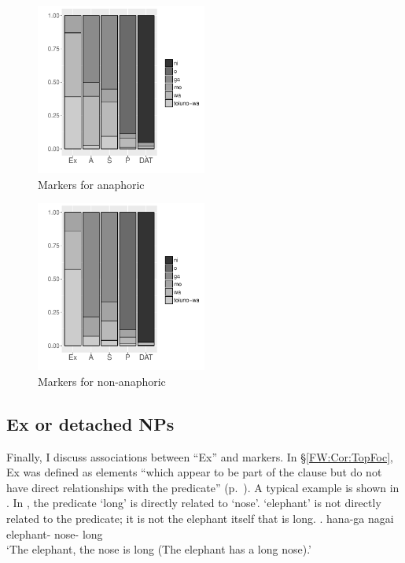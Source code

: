 \begin{figure}
	\begin{center}
	\includegraphics[width=0.5\textwidth]{figure/ASPParGiven.pdf}
	\caption{Markers for anaphoric}
	\label{Par:ASPParGivenF}
	\end{center}
\end{figure}
\begin{figure}
	\begin{center}
	\includegraphics[width=0.5\textwidth]{figure/ASPParNew.pdf}
	\caption{Markers for non-anaphoric}
	\label{Par:ASPParNewF}
	\end{center}
\end{figure}


\subsection{Ex or detached NPs}\label{Par:Subj:Ex}

Finally, I discuss associations between ``Ex'' and  markers.
In \S \ref{FW:Cor:TopFoc},
Ex was defined as elements ``which appear to be part of the clause but do not have direct relationships with the predicate'' (p.~\pageref{FW:Cor:TopFoc:ExDef}).
A typical example is shown in \Next.
In \Next, the predicate  `long' is directly related to  `nose'.
 `elephant' is not directly related to the predicate;
it is not the elephant itself that is long.
%
\exg.  hana-ga nagai \\
		elephant- nose- long \\
		`The elephant, the nose is long (The elephant has a long nose).' \hfill{\cite{mikami60}}

